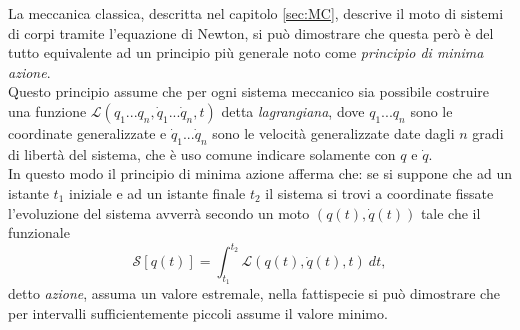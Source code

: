 \label{sec:MinimaAzione}
La meccanica classica, descritta nel capitolo \ref{sec:MC}, descrive il moto di sistemi di corpi tramite l'equazione di Newton, si può dimostrare che questa però è del tutto equivalente ad un principio più generale noto come \emph{principio di minima azione}.\\ Questo principio assume che per ogni sistema meccanico sia possibile costruire una funzione $\mathcal{L}(q_1...q_n,\dot{q}_1...\dot{q}_n,t)$ detta \emph{lagrangiana}, dove $q_1...q_n$ sono le coordinate generalizzate e $\dot{q}_1...\dot{q}_n$ sono le velocità generalizzate date dagli $n$ gradi di libertà del sistema, che è uso comune indicare solamente con $q$ e $\dot{q}$.\\ In questo modo il principio di minima azione afferma che: se si suppone che ad un istante $t_1$ iniziale e ad un istante finale $t_2$ il sistema si trovi a coordinate fissate l'evoluzione del sistema avverrà secondo un moto $(q(t),\dot{q}(t))$ tale che il funzionale 
\begin{equation}
    \label{Azione}
    \mathcal{S}[q(t)] =\int_{t_1}^{t_2} \mathcal{L}(q(t),\dot{q}(t),t)\ dt,
\end{equation}
detto \emph{azione}, assuma un valore estremale, nella fattispecie si può dimostrare che per intervalli sufficientemente piccoli assume il valore minimo.\\


